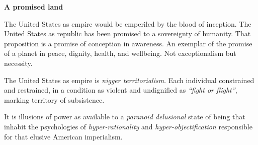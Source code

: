 

{\bf A promised land}

The United States as empire would be emperiled by the blood of
inception.  The United States as republic has been promised to a
sovereignty of humanity.  That proposition is a promise of conception
in awareness.  An exemplar of the promise of a planet in peace,
dignity, health, and wellbeing.  Not exceptionalism but necessity.

The United States as empire is {\it nigger territorialism}.  Each
individual constrained and restrained, in a condition as violent and
undignified as {\it ``fight or flight''}, marking territory of
subsistence.

It is illusions of power as available to a {\it paranoid delusional}
state of being that inhabit the psychologies of {\it
hyper-rationality} and {\it hyper-objectification} responsible for
that elusive American imperialism.

\bye
